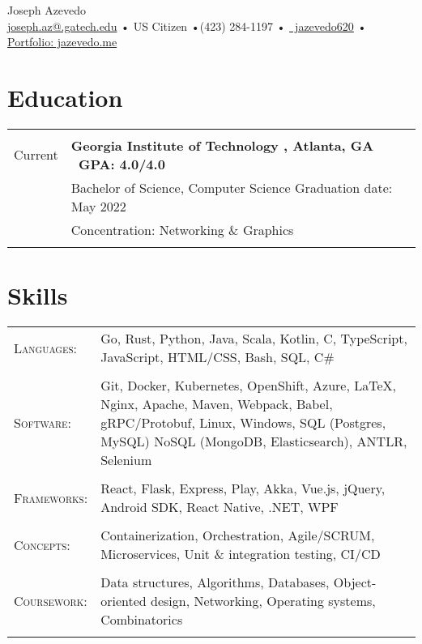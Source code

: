 \documentclass[a4paper,11pt]{article}
\newcommand{\lcolwidth}{2.2cm}
\newcommand{\lcolwidthinner}{2.1cm}
\newcommand{\rcolwidth}{16.2cm}
\newenvironment{rsection}[1]
  {
    \section{#1}
    \begin{tabular}{>{\raggedleft\arraybackslash}p{\lcolwidth}|p{\rcolwidth}}
   } {
    \\\multicolumn{2}{c}{} \\[-10pt]
    \end{tabular}
  }
\newcommand{\rheader}[2]{
    \multirow[t]{2}{*}{
        \begin{minipage}[t]{\lcolwidthinner}
            \begin{flushright}
                \textsc{#1}
            \end{flushright}
        \end{minipage}
    } & \textbf{#2}
}
\newcommand{\rline}[1]{\\& #1}
\newcommand{\ritem}[2][ •\hspace{3pt}]{\\[-2pt]& \footnotesize{#1#2}}
\newenvironment{rskills}[1][Skills]
  {
    \section{#1}
    \begin{tabular}{>{\raggedleft\arraybackslash}p{\lcolwidth}p{\rcolwidth}}
    } {
    \end{tabular}
  }
\newcommand{\rskill}[2]{\textsc{#1}:& \small #2 \\ & \\[-14pt]}
\newcommand{\rdot}{\xspace\hspace{0pt}•\hspace{3pt}\xspace}
\begin{document}
\hsize=7.5in \vsize=11in
\hoffset=-0.65in \voffset=-0.5in
\pdfpagewidth=8.5in
\pdfpageheight=11in
\pagestyle{empty}

\newcommand{\at}{@}
\newcommand{\dotgatechedu}{.gatech.edu}

\begin{center}
     \Huge       Joseph Azevedo
  \\[2pt] \normalsize \href{mailto:joseph.az\at\dotgatechedu}{joseph.az\at\dotgatechedu}
    \rdot US Citizen \rdot (423) 284-1197 \rdot
\href{https://github.com/jazevedo620}{\faGithub\ jazevedo620} \rdot
    \href{https://jazevedo.me}{Portfolio: jazevedo.me} \\[6pt]
\end{center}
\vspace{11pt}


\begin{rsection}{Education}
  \rheader{Jun 2018 -\\[-1pt] Current}{Georgia Institute of Technology
    {\normalfont, Atlanta, GA \hfill\  GPA: 4.0/4.0\ }}
  \rline{Bachelor of Science, Computer Science \hfill Graduation date: May 2022}
  \vspace{2pt}
  \ritem[]{Concentration: Networking \& Graphics}
\end{rsection}
\vspace{-4pt}


\begin{rskills}
  \rskill{Languages}  {Go, Rust, Python, Java, Scala, Kotlin, C, TypeScript,
                      JavaScript, HTML/CSS, Bash, SQL, C\#}
  \rskill{Software}   {Git, Docker, Kubernetes, OpenShift, Azure, \LaTeX,
                      Nginx, Apache, Maven, Webpack, Babel,
                      gRPC/Protobuf, Linux, Windows, SQL (Postgres, MySQL)
                      NoSQL (MongoDB, Elasticsearch), ANTLR, Selenium}
  \rskill{Frameworks} {React, Flask, Express, Play, Akka, Vue.js, jQuery,
                      Android SDK, React Native, .NET, WPF}
  \rskill{Concepts}   {Containerization, Orchestration, Agile/SCRUM, Microservices,
                      Unit \& integration testing, CI/CD}
  \rskill{Coursework} {Data structures, Algorithms, Databases, Object-oriented design,
                      Networking, Operating systems, Combinatorics}
\end{rskills}
\vspace{7pt}
\end{document}

